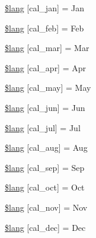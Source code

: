 \begin{DoxyCompactItemize}
\mbox{\hyperlink{calendar__lang_8php_a53bfa59721f2467fae84b63b8f905459}{\$lang}} \mbox{[}\textquotesingle{}cal\+\_\+jan\textquotesingle{}\mbox{]} = \textquotesingle{}Jan\textquotesingle{}
\item 
\mbox{\hyperlink{calendar__lang_8php_a2ac2b36f9c74b0d8e16037917fba7329}{\$lang}} \mbox{[}\textquotesingle{}cal\+\_\+feb\textquotesingle{}\mbox{]} = \textquotesingle{}Feb\textquotesingle{}
\item 
\mbox{\hyperlink{calendar__lang_8php_a42faa7b43903567bf28b50438b73f028}{\$lang}} \mbox{[}\textquotesingle{}cal\+\_\+mar\textquotesingle{}\mbox{]} = \textquotesingle{}Mar\textquotesingle{}
\item 
\mbox{\hyperlink{calendar__lang_8php_a257b49a3fb1c97fa61ad6b119830fd01}{\$lang}} \mbox{[}\textquotesingle{}cal\+\_\+apr\textquotesingle{}\mbox{]} = \textquotesingle{}Apr\textquotesingle{}
\item 
\mbox{\hyperlink{calendar__lang_8php_a2fe441f6a73f54209e7a06e04708ea48}{\$lang}} \mbox{[}\textquotesingle{}cal\+\_\+may\textquotesingle{}\mbox{]} = \textquotesingle{}May\textquotesingle{}
\item 
\mbox{\hyperlink{calendar__lang_8php_abb9cf27951ae82a0af7ab9ba0da03e3c}{\$lang}} \mbox{[}\textquotesingle{}cal\+\_\+jun\textquotesingle{}\mbox{]} = \textquotesingle{}Jun\textquotesingle{}
\item 
\mbox{\hyperlink{calendar__lang_8php_a949118eb45a5cfb893fbab8ad8ecde58}{\$lang}} \mbox{[}\textquotesingle{}cal\+\_\+jul\textquotesingle{}\mbox{]} = \textquotesingle{}Jul\textquotesingle{}
\item 
\mbox{\hyperlink{calendar__lang_8php_a716da1850b29b39798daccda0479fa57}{\$lang}} \mbox{[}\textquotesingle{}cal\+\_\+aug\textquotesingle{}\mbox{]} = \textquotesingle{}Aug\textquotesingle{}
\item 
\mbox{\hyperlink{calendar__lang_8php_ad710a9d122c0a4c5c1f40bb817c0fdaa}{\$lang}} \mbox{[}\textquotesingle{}cal\+\_\+sep\textquotesingle{}\mbox{]} = \textquotesingle{}Sep\textquotesingle{}
\item 
\mbox{\hyperlink{calendar__lang_8php_a10ed86cce085eaaf616b802870b7fadf}{\$lang}} \mbox{[}\textquotesingle{}cal\+\_\+oct\textquotesingle{}\mbox{]} = \textquotesingle{}Oct\textquotesingle{}
\item 
\mbox{\hyperlink{calendar__lang_8php_ae8dbd54567f9ed82df3078b50b3ed71e}{\$lang}} \mbox{[}\textquotesingle{}cal\+\_\+nov\textquotesingle{}\mbox{]} = \textquotesingle{}Nov\textquotesingle{}
\item 
\mbox{\hyperlink{calendar__lang_8php_a0d70b452fc659e14baa3db6bbea3e199}{\$lang}} \mbox{[}\textquotesingle{}cal\+\_\+dec\textquotesingle{}\mbox{]} = \textquotesingle{}Dec\textquotesingle{}

\end{DoxyCompactItemize}

